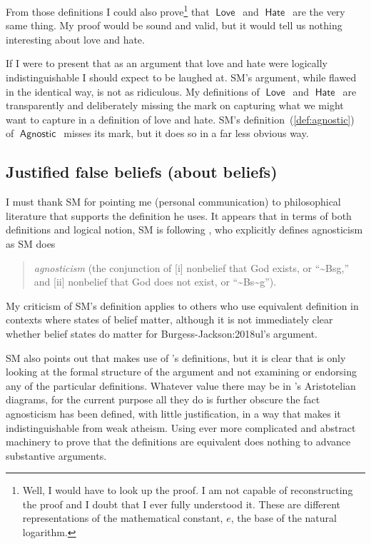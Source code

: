 \documentclass[12pt]{article}
\newcommand{\rel}[1]{\ensuremath{\mathop{\mathsf{#1}}}}
\newcommand{\rlagno}{\rel{Agnostic}}
\newcommand{\rllove}{\rel{Love}}
\newcommand{\rlhate}{\rel{Hate}}
\begin{document}
From those definitions I could also prove\footnote{%
    Well, I would have to look up the proof.
    I am not capable of reconstructing the proof and I doubt that I ever fully understood it.
    These are different representations of the mathematical constant,
    $e$, the base of the natural logarithm.}
that \rllove\ and \rlhate\ are the very same thing.
My proof would be sound and valid, but it would tell us nothing interesting about love and hate.

If I were to present that as an argument that love and hate were logically indistinguishable I should expect to be laughed at.
SM's argument, while flawed in the identical way, is not as ridiculous.
My definitions of \rllove\ and \rlhate\ are transparently and deliberately missing the mark on capturing what we might want to capture in a definition of love and hate.
SM's definition~(\ref{def:agnostic}) of \rlagno\ misses its mark,
but it does so in a far less obvious way.

\subsection{Justified false beliefs (about beliefs)}

I must thank SM for pointing me (personal communication) to philosophical literature that supports the definition he uses.
It appears that in terms of both definitions and logical notion, SM is following \textcite{Burgess-Jackson:2018ul}, who explicitly defines agnosticism as SM does
\begin{quotation}
    \emph{agnosticism} (the conjunction of 
       [i] nonbelief that God exists, or “\textasciitilde Bsg,” and
       [ii] nonbelief that God does not exist, or “\textasciitilde Bs\textasciitilde g”).
\end{quotation}
My criticism of SM's definition applies to others who use equivalent definition in contexts where states of belief matter, although it is not immediately clear whether belief states do matter for \citeauthor{}{Burgess-Jackson:2018ul}'s argument.

SM also points out that \textcite{Demey:2019vb} makes use of \citeauthor{Burgess-Jackson:2018ul}'s definitions, but it is clear that \citeauthor{Demey:2019vb} is only looking at the formal structure of the argument and not examining or endorsing any of the particular definitions. Whatever value there may be in \citeauthor{Demey:2019vb}'s Aristotelian diagrams, for the current purpose all they do is further obscure the fact agnosticism has been defined, with little justification, in a way that makes it indistinguishable from weak atheism. Using ever more complicated and abstract machinery to prove that the definitions are equivalent does nothing to advance substantive arguments.
\end{document}
